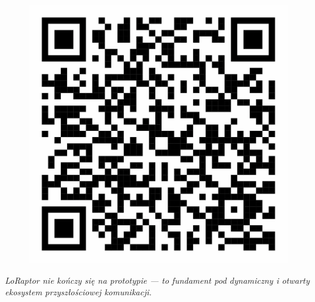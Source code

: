 \begin{figure}[H]
	\centering
	\begin{minipage}[b]{0.45\textwidth}
		\centering
		\includegraphics[width=\textwidth]{root/repo_qr.png}
	\end{minipage}
\end{figure}

\begin{center}
	\emph{LoRaptor nie kończy się na prototypie --- to fundament pod dynamiczny i otwarty ekosystem przyszłościowej komunikacji.}
\end{center}